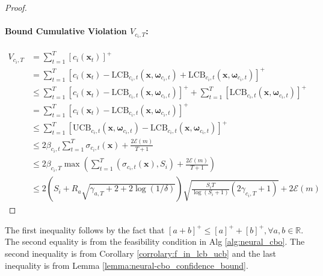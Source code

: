 \begin{proof}
\paragraph{Bound Cumulative Violation $V_{c_i, T}$:}
\begin{align*}
V_{c_i, T}  & = \sum_{t=1}^T [c_i(\mathbf{x}_t)]^+ \\
& = \sum_{t=1}^T[c_i(\mathbf{x}_t) - \text{LCB}_{c_i,t}(\mathbf{x}, \boldsymbol{\omega}_{c_i,t}) + \text{LCB}_{c_i,t}(\mathbf{x}, \boldsymbol{\omega}_{c_i,t})]^+
\\
& \le \sum_{t=1}^T[c_i(\mathbf{x}_t) - \text{LCB}_{c_i,t}(\mathbf{x}, \boldsymbol{\omega}_{c_i,t})]^+  + \sum_{t=1}^T [\text{LCB}_{c_i,t}(\mathbf{x}, \boldsymbol{\omega}_{c_i,t})]^+ 
\\
& = \sum_{t=1}^T[c_i(\mathbf{x}_t) - \text{LCB}_{c_i,t}(\mathbf{x}, \boldsymbol{\omega}_{c_i,t})]^+
\\
& \le \sum_{t=1}^T[\text{UCB}_{c_i,t}(\mathbf{x}, \boldsymbol{\omega}_{c_i,t}) - \text{LCB}_{c_i,t}(\mathbf{x}, \boldsymbol{\omega}_{c_i,t})]^+
\\
& \le 2 \beta_{c_i,t} \sum_{t=1}^T \sigma_{c_i,t}(\mathbf{x})  + \frac{2 \mathcal{E}(m)}{T+1} 
\\ 
& \le 2 \beta_{c_i,T} \max\left (\sum_{t=1}^T \left(\sigma_{c_i,t}(\mathbf{x}), S_i \right)  + \frac{2 \mathcal{E}(m)}{T+1}  \right)
\\
& \le 2 \left(S_i + R_a \sqrt{\gamma_{a,T} + 2 + 2 \log(1/\delta)} \right) \sqrt{\frac{ S_i T}{\log(S_i+1)} (2\gamma_{c_i,T}+1)} + 2 \mathcal{E}(m)
\end{align*}
\end{proof}

The first inequality follows by the fact that $[a+b]^+ \le [a]^+ + [b]^+, \forall a,b \in \mathbb{R}$. The second equality is from the feasibility condition in Alg \ref{alg:neural_cbo}. The second inequality is from Corollary  \ref{corrolary:f_in_lcb_ucb} and the last inequality is from Lemma \ref{lemma:neural-cbo_confidence_bound}. 



